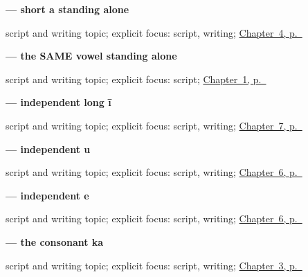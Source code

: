 \noindent\begin{minipage}[t]{\linewidth}
\raggedright
\textbf{ — short a standing alone}\par
\footnotesize script and writing topic; explicit focus: script, writing; \hyperref[ch:gu-first-use-forms-a]{Chapter~4, p.~\pageref*{ch:gu-first-use-forms-a}}
\end{minipage}\par\smallskip

\noindent\begin{minipage}[t]{\linewidth}
\raggedright
\textbf{ — the SAME vowel standing alone}\par
\footnotesize script and writing topic; explicit focus: script; \hyperref[ch:first-greeting-script]{Chapter~1, p.~\pageref*{ch:first-greeting-script}}
\end{minipage}\par\smallskip

\noindent\begin{minipage}[t]{\linewidth}
\raggedright
\textbf{ — independent long ī}\par
\footnotesize script and writing topic; explicit focus: script, writing; \hyperref[ch:gu-final-script-closure-b]{Chapter~7, p.~\pageref*{ch:gu-final-script-closure-b}}
\end{minipage}\par\smallskip

\noindent\begin{minipage}[t]{\linewidth}
\raggedright
\textbf{ — independent u}\par
\footnotesize script and writing topic; explicit focus: script, writing; \hyperref[ch:gu-final-script-closure-a]{Chapter~6, p.~\pageref*{ch:gu-final-script-closure-a}}
\end{minipage}\par\smallskip

\noindent\begin{minipage}[t]{\linewidth}
\raggedright
\textbf{ — independent e}\par
\footnotesize script and writing topic; explicit focus: script, writing; \hyperref[ch:gu-final-script-closure-a]{Chapter~6, p.~\pageref*{ch:gu-final-script-closure-a}}
\end{minipage}\par\smallskip

\noindent\begin{minipage}[t]{\linewidth}
\raggedright
\textbf{ — the consonant ka}\par
\footnotesize script and writing topic; explicit focus: script, writing; \hyperref[ch:gu-doorway-forms]{Chapter~3, p.~\pageref*{ch:gu-doorway-forms}}
\end{minipage}\par\smallskip

